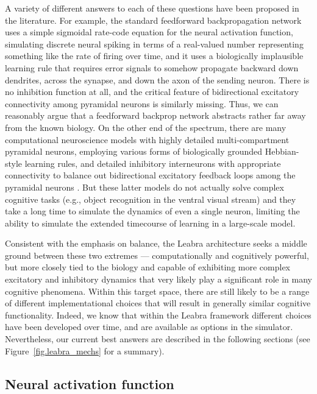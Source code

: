 \documentclass[11pt,twoside]{article}
\begin{document}
A variety of different answers to each of these questions have been proposed
in the literature.  For example, the standard feedforward backpropagation
network uses a simple sigmoidal rate-code equation for the neural activation
function, simulating discrete neural spiking in terms of a real-valued number
representing something like the rate of firing over time, and it uses a
biologically implausible learning rule that requires error signals to somehow
propagate backward down dendrites, across the synapse, and down the axon of
the sending neuron.  There is no inhibition function at all, and the critical
feature of bidirectional excitatory connectivity among pyramidal neurons is
similarly missing.  Thus, we can reasonably argue that a feedforward backprop
network abstracts rather far away from the known biology.  On the other end of
the spectrum, there are many computational neuroscience models with highly
detailed multi-compartment pyramidal neurons, employing various forms of
biologically grounded Hebbian-style learning rules, and detailed inhibitory
interneurons with appropriate connectivity to balance out bidirectional
excitatory feedback loops among the pyramidal neurons
\cite[e.g.,]{Markram06,TraubMilesWong89,IzhikevichEdelman08}.  But these
latter models do not actually solve complex cognitive tasks (e.g., object
recognition in the ventral visual stream) and they take a long time to
simulate the dynamics of even a single neuron, limiting the ability to
simulate the extended timecourse of learning in a large-scale model.

Consistent with the emphasis on balance, the Leabra architecture seeks a
middle ground between these two extremes --- computationally and cognitively
powerful, but more closely tied to the biology and capable of exhibiting more
complex excitatory and inhibitory dynamics that very likely play a significant
role in many cognitive phenomena.  Within this target space, there are still
likely to be a range of different implementational choices that will result in
generally similar cognitive functionality.  Indeed, we know that within the
Leabra framework different choices have been developed over time, and are
available as options in the simulator.  Nevertheless, our current best answers
are described in the following sections (see Figure~\ref{fig.leabra_mechs} for
a summary).

\subsection{Neural activation function}
\end{document}
